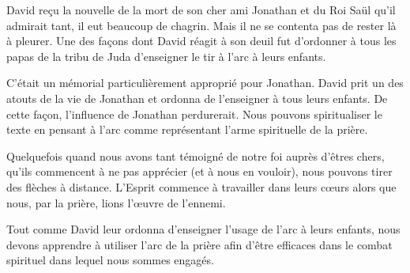 



 David reçu la nouvelle de la mort
 de son cher ami Jonathan et du Roi Saül qu'il admirait tant,
 il eut beaucoup de chagrin. Mais il ne se contenta pas de rester
 là à pleurer.
 Une des façons dont David réagit à son deuil fut d'ordonner
 à tous les papas de la tribu de Juda d'enseigner le tir à l'arc
 à leurs enfants.

C'était un mémorial particulièrement approprié pour Jonathan.
 David prit un des atouts de la vie de Jonathan et ordonna
 de l'enseigner à tous leurs enfants. De cette façon,
 l'influence de Jonathan perdurerait.
 Nous pouvons spiritualiser le texte en pensant à l'arc
 comme représentant l'arme spirituelle de la prière.


Quelquefois quand nous avons tant témoigné de notre foi auprès d'êtres chers,
 qu'ils commencent à ne pas apprécier (et à nous en vouloir),
 nous pouvons tirer des flèches à distance.
 L'Esprit commence à travailler dans leurs cœurs alors que nous,
 par la prière, lions l'œuvre de l'ennemi.

Tout comme David leur ordonna d'enseigner l'usage de l'arc à leurs enfants,
 nous devons apprendre à utiliser l'arc de la prière afin d'être efficaces
 dans le combat spirituel dans lequel nous sommes engagés. 

\dvrule






